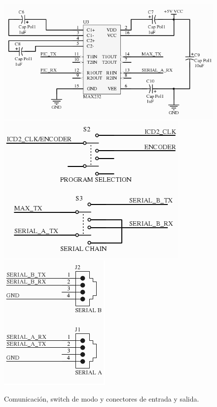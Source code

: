 \begin{figure}
	\centering
	\includegraphics[scale=.28]{figuras/dc_schemaComm1.png}
	\includegraphics[scale=.28]{figuras/dc_schemaComm2.png}
	\includegraphics[scale=.28]{figuras/dc_schemaComm3.png}
	\caption{Comunicaci\'on, switch de modo y conectores de entrada y salida.}
	\label{hF_placa_dc_schema2}
\end{figure}

